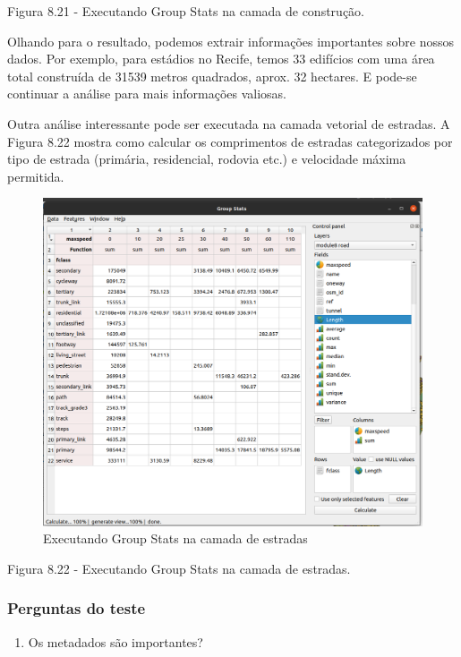 \documentclass[
  portuguese,
]{krantz}
\providecommand{\tightlist}{%
  \setlength{\itemsep}{0pt}\setlength{\parskip}{0pt}}
\begin{document}
Figura 8.21 - Executando Group Stats na camada de construção.

Olhando para o resultado, podemos extrair informações importantes sobre nossos dados. Por exemplo, para estádios no Recife, temos 33 edifícios com uma área total construída de 31539 metros quadrados, aprox. 32 hectares. E pode-se continuar a análise para mais informações valiosas.

Outra análise interessante pode ser executada na camada vetorial de estradas. A Figura 8.22 mostra como calcular os comprimentos de estradas categorizados por tipo de estrada (primária, residencial, rodovia etc.) e velocidade máxima permitida.

\begin{figure}
\centering
\includegraphics{media/modulo8/fig822.png}
\caption{Executando Group Stats na camada de estradas}
\end{figure}

Figura 8.22 - Executando Group Stats na camada de estradas.

\hypertarget{perguntas-do-teste}{%
\subsubsection{\texorpdfstring{\textbf{Perguntas do teste}}{Perguntas do teste}}\label{perguntas-do-teste}}

\begin{enumerate}
\def\labelenumi{\arabic{enumi}.}
\tightlist
\item
  Os metadados são importantes?
\end{enumerate}
\end{document}
